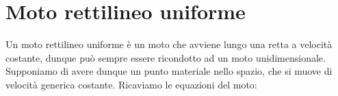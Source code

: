 \section{Moto rettilineo uniforme}
Un moto rettilineo uniforme è un moto che avviene lungo una retta a velocità costante,
dunque può sempre essere ricondotto ad un moto unidimensionale.\\
Supponiamo di avere dunque un punto materiale nello spazio, che si muove di velocità generica
costante. Ricaviamo le equazioni del moto: